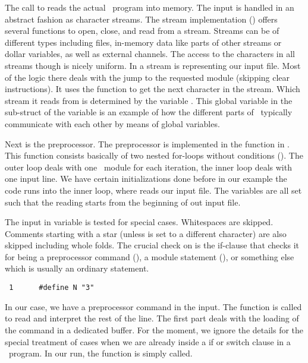 The call to  reads the actual \FORM\ program into memory. The
input is handled in an abstract fashion as character streams. The stream implementation
() offers several functions to open, close, and read from a stream.
Streams can be of different types including files, in-memory data like parts of
other streams or dollar variables, as well as external channels. The access to
the characters in all streams though is nicely uniform. In
 a stream is representing our input file. Most of the logic
there deals with the jump to the requested module (skipping clear instructions).
It uses the function  to get the next character in the stream.
Which stream it reads from is determined by the variable .
This global variable in the sub-struct  of the 
variable  is an example of how the different parts of \FORM\ typically
communicate with each other by means of global variables.

Next is the preprocessor. The preprocessor is implemented in the function
 in . This function consists basically of two nested
for-loops without conditions (). The outer loop deals
with one \FORM\ module for each iteration, the inner loop deals with one input
line. We have certain initializations done before in our example the code runs
into the inner loop, where  reads our input file. The variables
are all set such that the reading starts from the beginning of out input file.

The input in variable  is tested for special cases. Whitespaces are
skipped. Comments starting with a star \C{*} (unless  is set to a
different character) are also skipped including whole folds. The crucial check
on  is the if-clause that checks it for being a preprocessor command (\C{\#}),
a module statement (), or something else which is usually an ordinary
statement.

\begin{verbatim}
 1      #define N "3"
\end{verbatim}

In our case, we have a preprocessor command in the input. The function
 is called to read and interpret the rest of the line.
The first part deals with the loading of the command in a dedicated buffer. For
the moment, we ignore the details for the special treatment of cases when we are
already inside a if or switch clause in a \FORM\ program. In our run, the
function  is simply called.


